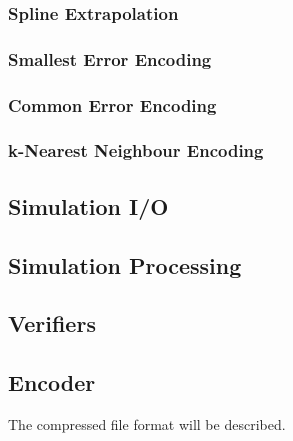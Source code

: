 \documentclass[a4paper,11pt]{report}
\begin{document}
\subsubsection{Spline Extrapolation}

\subsubsection{Smallest Error Encoding}

\subsubsection{Common Error Encoding}

\subsubsection{k-Nearest Neighbour Encoding}


\subsection{Simulation I/O}

\subsection{Simulation Processing}

\subsection{Verifiers}

\subsection{Encoder}


The compressed file format will be described.
\end{document}
